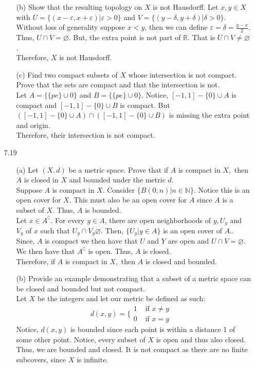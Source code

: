 \documentclass[12pt]{article}
\newcommand{\R}{\mathbb{R}}
\begin{document}
\begin{enumerate}
\begin{enumerate}
			\item[(b)] Show that the resulting topology on $X$ is not Hausdorff.
			Let $ x,y\in X $ with $ U = \{(x-\varepsilon,x+\varepsilon)|\varepsilon>0\} $ and $ V = \{(y-\delta,y+\delta)|\delta > 0\} $. Without loss of generality suppose $ x < y $, then we can define $ \varepsilon=\delta=\frac{y-x}{2} $. 
			Thus, $ U\cap V = \varnothing $. But, the extra point is not part of $ \R $. That is $ U\cap V \neq \varnothing $. \\
			Therefore, $ X $ is not Hausdorff.
			\item[(c)] Find two compact subsets of $X$ whose intersection is not compact. Prove
			that the sets are compact and that the intersection is not.\\
			Let $ A = \{\{pe\}\cup 0\} $ and $ B=\{\{pe\}\cup 0\} $. Notice, $ [-1,1] -\{0\}\cup A$ is compact and $ [-1,1]-\{0\}\cup B $ is compact. But $ ([-1,1]-\{0\}\cup A)\cap ( [-1,1]-\{0\}\cup B ) $ is missing the extra point and origin. \\ 
			Therefore, their intersection is not compact.
		\end{enumerate}
		
		\item[7.19] \begin{enumerate}
			\item[(a)] Let $( X , d )$ be a metric space. Prove that if $A$ is compact in $X ,$ then $A$ is closed in $X$ and bounded under the metric $d .$\\
			Suppose $ A $ is compact in $ X $.  Consider $\{B(0,n)|n\in \mathbb{N}\} $. Notice this is an open cover for $ X $. This must also be an open cover for $ A $ since $ A $ is a subset of $ X $. Thus, $ A $ is bounded.\\
			Let $ x \in A^\complement $. For every $ y \in A $, there are open neighborhoods of  $y, U_y $ and $ V_y $ of $ x $ such that $ U_y \cap V_y \varnothing $. Then, $ \{U_y|y\in A\} $ is an open cover of $ A. $. Since, $ A $ is compact we then have that $ U $ and $ Y $ are open and $ U\cap V = \varnothing$. We then have that $ A^\complement$ is open. Thus, $ A $ is closed.\\
			Therefore, if $A$ is compact in $X ,$ then $A$ is closed and bounded.
			\item[(b)] Provide an example demonstrating that a subset of a metric space can be
			closed and bounded but not compact.\\
			
			Let $ X $ be the integers and let our metric be defined as such:
				\[d(x,y) = \{\begin{array} {ll} {1} & {\text{ if  $x \neq y$ }} \\ {0} & {\text { if $x = y$}} \end{array}\]
			Notice, $ d(x,y) $ is bounded since each point is within a distance 1 of some other point. Notice, every subset of $ X $ is open and thus also closed. Thus, we are bounded and closed. It is not compact as there are no finite subcovers, since $ X $ is infinite.
		\end{enumerate}
	\end{enumerate}
\end{document}
